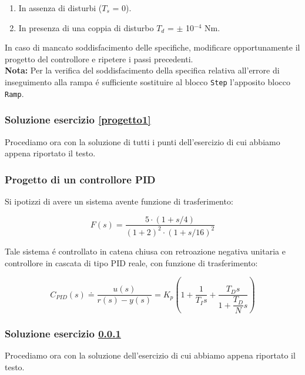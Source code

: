 \documentclass[../main.tex]{subfiles}
\begin{document}
\begin{enumerate}
	\item In assenza di disturbi ($T_s$ = 0).
	\item In presenza di una coppia di disturbo $T_d$ = $\pm$ 10$^{-4}$ Nm.
\end{enumerate}


In caso di mancato soddisfacimento delle specifiche, modificare opportunamente il progetto del controllore e ripetere i passi precedenti.\\

\textbf{Nota:} Per la verifica del soddisfacimento della specifica relativa all’errore di inseguimento alla rampa é sufficiente sostituire al blocco \texttt{Step} l’apposito blocco \texttt{Ramp}.


\subsubsection*{Soluzione esercizio \ref{progetto1}}

Procediamo ora con la soluzione di tutti i punti dell'esercizio di cui abbiamo appena riportato il testo.




\vspace*{1cm}
\subsubsection{Progetto di un controllore PID}
\label{progetto2}

Si ipotizzi di avere un sistema avente funzione di trasferimento:

\begin{equation}
	F(s) = \frac{5 \cdot ( 1+ s/4)}{(1+2)^2 \cdot ( 1+ s/16 )^2 }
\end{equation}

Tale  sistema é controllato in catena chiusa con retroazione negativa unitaria e controllore in cascata di tipo PID reale, con funzione di trasferimento:

\begin{equation}
	C_{PID}(s) \doteq \frac{u(s)}{r(s) - y(s)} = K_p \left( 1 + \frac{1}{T_Is} + \frac{T_Ds}{1 + \dfrac{T_D}{N}s} \right) 
\end{equation}



\subsubsection*{Soluzione esercizio \ref{progetto2}}

Procediamo ora con la soluzione dell'esercizio di cui abbiamo appena riportato il testo.
\end{document}
